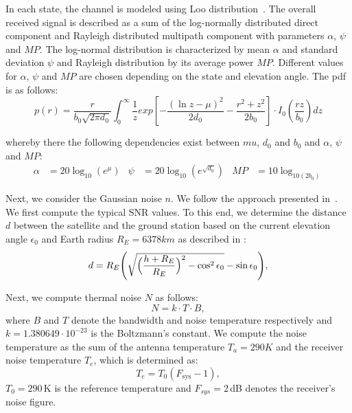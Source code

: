\documentclass[conference]{IEEEtran}
\begin{document}
In each state, the channel is modeled using Loo distribution~\cite{}. 
The overall received signal is described as a sum of the log-normally distributed direct component and Rayleigh distributed multipath component with parameters $\alpha$, $\psi$ and $MP$.
The log-normal distribution is characterized by mean $\alpha$ and standard deviation $\psi$ and Rayleigh distribution by its average power $MP$.
Different values for $\alpha$, $\psi$ and $MP$ are chosen depending on the state and elevation angle.
The pdf is as follows:
\begin{equation}
  p(r) = \frac{r}{b_0\sqrt{2\pi d_0}} \int_{0}^{\infty}\frac{1}{z} exp\left[-\frac{(\ln z - \mu)^2}{2d_0} - \frac{r^2 + z^2}{2b_0}\right] \cdot I_0\left(\frac{rz}{b_0}\right) dz
\end{equation}

whereby there the following dependencies exist between $mu$, $d_0$ and $b_0$ and $\alpha$, $\psi$ and $MP$:
\begin{align}
\alpha &= 20\log_{10}(e^\mu)  & \psi &= 20\log_{10}(e^{\sqrt{d_0}}) & MP &= 10\log_{10(2b_0)}  
\end{align}

Next, we consider the Gaussian noise $n$. We follow the approach presented in~\cite{LCN23}. 
We first compute the typical SNR values. 
To this end, we determine the distance $d$ between the satellite and the ground station based on the current elevation angle $\epsilon_0$ and Earth radius $R_E = 6378 km$ as described in \cite{}:
%
\begin{equation}
  d = R_E\Biggl(\sqrt{\Bigl(\frac{h + R_E}{R_E}\Bigr)^2 - \cos^{2}\epsilon_{0}} - \sin\epsilon_{0}\Biggr),
\end{equation}
%

Next, we compute thermal noise $N$ as follows:
%
\begin{equation}
  N=k \cdot T \cdot B,
\end{equation}
%
where $B$ and $T$ denote the bandwidth and noise temperature respectively and $k = 1.380649 \cdot 10^{-23}$ is the Boltzmann's constant.
We compute the noise temperature as the sum of the antenna temperature $T_a = 290 K$ and the receiver noise temperature $T_e$, which is determined as:
%
\begin{equation}
  T_e = T_0(F_{\mathrm{sys}} - 1),
\end{equation}
%
$T_0 = 290$\,K is the reference temperature and $F_{sys} = 2$\,dB denotes the receiver's noise figure.
\end{document}
